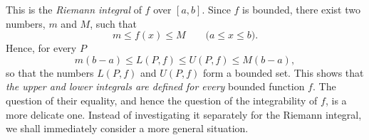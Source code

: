 \begin{definition}
    This is the \emph{Riemann integral} of \(f\) over \(\left[a,b\right]\). Since \(f\) is bounded, there exist two numbers, \(m\) and \(M\), such that
    \begin{equation*}
        m\leqslant f\left(x\right)\leqslant M\qquad\text{(\(a\leqslant x\leqslant b\))}.
    \end{equation*}
    Hence, for every \(P\)
    \begin{equation*}
        m\left(b-a\right)\leqslant L\left(P,f\right)\leqslant U\left(P,f\right)\leqslant M\left(b-a\right),
    \end{equation*}
    so that the numbers \(L\left(P,f\right)\) and \(U\left(P,f\right)\) form a bounded set. This shows that \emph{the upper and lower integrals are defined for every} bounded function \(f\). The question of their equality, and hence the question of the integrability of \(f\), is a more delicate one. Instead of investigating it separately for the Riemann integral, we shall immediately consider a more general situation.
\end{definition}

